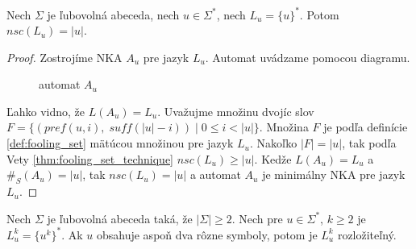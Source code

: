 \begin{lemma}
\label{lm:one_word_cycle_nsc}
Nech $ \Sigma $ je ľubovolná abeceda, nech $ u \in \Sigma^* $, nech $ L_u = \lbrace u \rbrace^* $. Potom $ nsc(L_u) = |u| $.
\end{lemma}

\begin{proof}
Zostrojíme NKA $ A_u $ pre jazyk $ L_u $. Automat uvádzame pomocou diagramu.

\begin{figure}[H]
\centering
{}
\caption{automat $ A_u $}
\end{figure}
Ľahko vidno, že $ L(A_u) = L_u $. Uvažujme množinu dvojíc slov $ F = \lbrace (pref(u,i), \; suff(|u|-i)) \; | \; 0 \leq i < |u| \rbrace $. Množina $ F $ je podľa definície \ref{def:fooling_set} mätúcou množinou pre jazyk $ L_u $. Nakoľko $ |F|=|u| $, tak podľa Vety \ref{thm:fooling_set_technique} $ nsc(L_u) \geq |u| $. Kedže $ L(A_u) = L_u $ a $ \#_S(A_u) = |u| $, tak $ nsc(L_u) = |u| $ a automat $ A_u $ je minimálny NKA pre jazyk $ L_u $.
\end{proof}

\begin{theorem}
Nech $ \Sigma $ je ľubovolná abeceda taká, že $ |\Sigma| \geq 2 $. Nech pre $ u \in \Sigma^* $, $ k \geq 2 $ je $ L_u^k = \lbrace u^k \rbrace^* $. Ak $ u $ obsahuje aspoň dva rôzne symboly, potom je $ L_u^k $ rozložiteľný.
\end{theorem}


